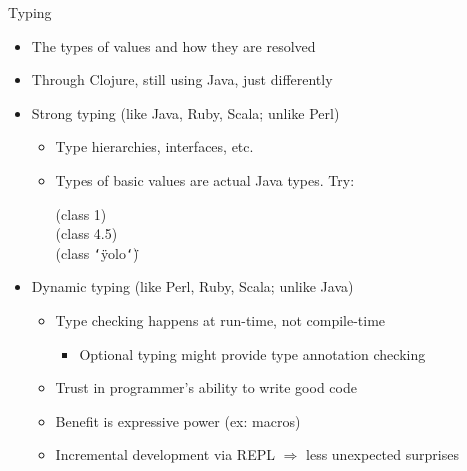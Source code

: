 \documentclass{beamer}
\renewcommand{\textquotedbl}{\texttt{\char`\"}}
\begin{document}
\begin{frame}{Typing}
  \begin{itemize}
  \item The types of values and how they are resolved
  \item Through Clojure, still using Java, just differently
  \item Strong typing (like Java, Ruby, Scala; unlike Perl)
    \begin{itemize}
      \item Type hierarchies, interfaces, etc.
      \item Types of basic values are actual Java types. Try:\\
\begin{ttfamily}
(class 1)\\
(class 4.5)\\
(class \textquotedbl yolo\textquotedbl)
\end{ttfamily}
    \end{itemize}
  \item Dynamic typing (like Perl, Ruby, Scala; unlike Java)
    \begin{itemize}
      \item Type checking happens at run-time, not compile-time
        \begin{itemize}
          \item Optional typing might provide type annotation checking
        \end{itemize}
      \item Trust in programmer's ability to write good code
      \item Benefit is expressive power (ex: macros)
      \item Incremental development via REPL $\Rightarrow$ less unexpected
        surprises
    \end{itemize}
  \end{itemize}
\end{frame}
\end{document}
